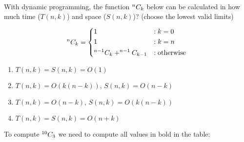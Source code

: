 {
\renewcommand{\thechapter}{\arabic{chapter}N}
\setcounter{chapter}{18}


With dynamic programming, the function $^{n}C_{k}$ below can be calculated in how much time ($T(n,k)$) and space ($S(n,k)$)? (choose the lowest valid limits)

\begin{equation*}
    ^{n}C_{k} = \begin{dcases}
        1                               & : k = 0 \\
        1                               & : k = n \\
        ^{n-1}C_{k} + ^{n-1}C_{k-1} & : \text{otherwise}
    \end{dcases}
\end{equation*}

\begin{enumerate}[label=\Alph*)]\itemsep0em
    \item $T(n,k)=S(n,k)=O(1)$
    \item $T(n,k)=O(k(n-k))$, $S(n,k)=O(n-k)$ \greencheckmark
    \item $T(n,k)=O(n-k)$, $S(n,k)=O(k(n-k))$
    \item $T(n,k)=S(n,k)=O(n+k)$
\end{enumerate}
\ansseparator

To compute $^{10}C_{3}$ we need to compute all values in bold in the table:

}
